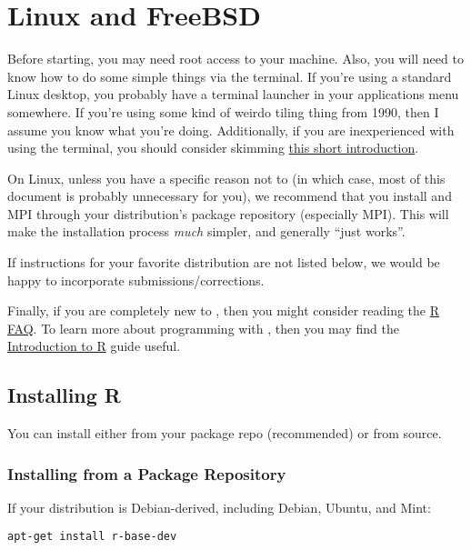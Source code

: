 \section{Linux and FreeBSD}

Before starting, you may need root access to your machine.  Also, you will need to know how to do some simple things via the terminal.  If you're using a standard Linux desktop, you probably have a terminal launcher in your applications menu somewhere.  If you're using some kind of weirdo tiling thing from 1990, then I assume you know what you're doing.  Additionally, if you are inexperienced with using the terminal, you should consider skimming \href{http://community.linuxmint.com/tutorial/view/100}{this short introduction}.

On Linux, unless you have a specific reason not to (in which case, most of this document is probably unnecessary for you), we recommend that you install  and MPI through your distribution's package repository (especially MPI).  This will make the installation process \emph{much} simpler, and generally ``just works''.

If instructions for your favorite distribution are not listed below, we would be happy to incorporate submissions/corrections.

Finally, if you are completely new to , then you might consider reading the \href{http://cran.r-project.org/doc/FAQ/R-FAQ.html}{R FAQ}.  To learn more about programming with , then you may find the \href{http://cran.us.r-project.org/doc/manuals/R-intro.html}{Introduction to R} guide useful.






\subsection{Installing R}

You can install  either from your package repo (recommended) or from source.

\subsubsection{Installing from a Package Repository}

If your distribution is Debian-derived, including Debian, Ubuntu, and Mint:
\begin{lstlisting}[language=sh]
apt-get install r-base-dev
\end{lstlisting}

